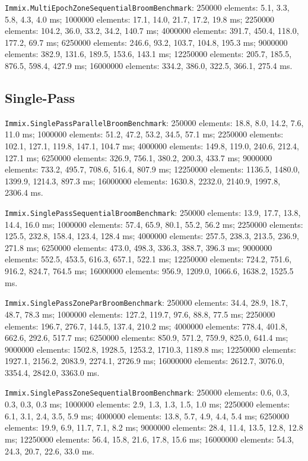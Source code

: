 \documentclass[
  english,   %
  bibtex,    %
]{kththesis}
\begin{document}
\texttt{Immix.MultiEpochZoneSequentialBroomBenchmark}: 250000 elements: 5.1, 3.3,
5.8, 4.3, 4.0 ms; 1000000 elements: 17.1, 14.0, 21.7, 17.2, 19.8 ms; 2250000
elements: 104.2, 36.0, 33.2, 34.2, 140.7 ms; 4000000 elements: 391.7, 450.4,
118.0, 177.2, 69.7 ms; 6250000 elements: 246.6, 93.2, 103.7, 104.8, 195.3 ms;
9000000 elements: 382.9, 131.6, 189.5, 153.6, 143.1 ms; 12250000 elements:
205.7, 185.5, 876.5, 598.4, 427.9 ms; 16000000 elements: 334.2, 386.0, 322.5,
366.1, 275.4 ms.

\subsection{Single-Pass}

\texttt{Immix.SinglePassParallelBroomBenchmark}: 250000 elements: 18.8, 8.0,
14.2, 7.6, 11.0 ms; 1000000 elements: 51.2, 47.2, 53.2, 34.5, 57.1 ms;
2250000 elements: 102.1, 127.1, 119.8, 147.1, 104.7 ms; 4000000 elements:
149.8, 119.0, 240.6, 212.4, 127.1 ms; 6250000 elements: 326.9, 756.1, 380.2,
200.3, 433.7 ms; 9000000 elements: 733.2, 495.7, 708.6, 516.4, 807.9 ms;
12250000 elements: 1136.5, 1480.0, 1399.9, 1214.3, 897.3 ms; 16000000
elements: 1630.8, 2232.0, 2140.9, 1997.8, 2306.4 ms.

\texttt{Immix.SinglePassSequentialBroomBenchmark}: 250000 elements: 13.9, 17.7,
13.8, 14.4, 16.0 ms; 1000000 elements: 57.4, 65.9, 80.1, 55.2, 56.2 ms;
2250000 elements: 125.5, 232.8, 158.4, 123.4, 128.4 ms; 4000000 elements:
257.5, 238.3, 213.5, 236.9, 271.8 ms; 6250000 elements: 473.0, 498.3, 336.3,
388.7, 396.3 ms; 9000000 elements: 552.5, 453.5, 616.3, 657.1, 522.1 ms;
12250000 elements: 724.2, 751.6, 916.2, 824.7, 764.5 ms; 16000000 elements:
956.9, 1209.0, 1066.6, 1638.2, 1525.5 ms.

\texttt{Immix.SinglePassZoneParBroomBenchmark}: 250000 elements: 34.4, 28.9,
18.7, 48.7, 78.3 ms; 1000000 elements: 127.2, 119.7, 97.6, 88.8, 77.5 ms;
2250000 elements: 196.7, 276.7, 144.5, 137.4, 210.2 ms; 4000000 elements:
778.4, 401.8, 662.6, 292.6, 517.7 ms; 6250000 elements: 850.9, 571.2, 759.9,
825.0, 641.4 ms; 9000000 elements: 1502.8, 1928.5, 1253.2, 1710.3, 1189.8 ms;
12250000 elements: 1927.1, 2156.2, 2083.9, 2274.1, 2726.9 ms; 16000000
elements: 2612.7, 3076.0, 3354.4, 2842.0, 3363.0 ms.

\texttt{Immix.SinglePassZoneSequentialBroomBenchmark}: 250000 elements: 0.6,
0.3, 0.3, 0.3, 0.3 ms; 1000000 elements: 2.9, 1.3, 1.3, 1.5, 1.0 ms; 2250000
elements: 6.1, 3.1, 2.4, 3.5, 5.9 ms; 4000000 elements: 13.8, 5.7, 4.9, 4.4,
5.4 ms; 6250000 elements: 19.9, 6.9, 11.7, 7.1, 8.2 ms; 9000000 elements:
28.4, 11.4, 13.5, 12.8, 12.8 ms; 12250000 elements: 56.4, 15.8, 21.6, 17.8,
15.6 ms; 16000000 elements: 54.3, 24.3, 20.7, 22.6, 33.0 ms.
\end{document}
